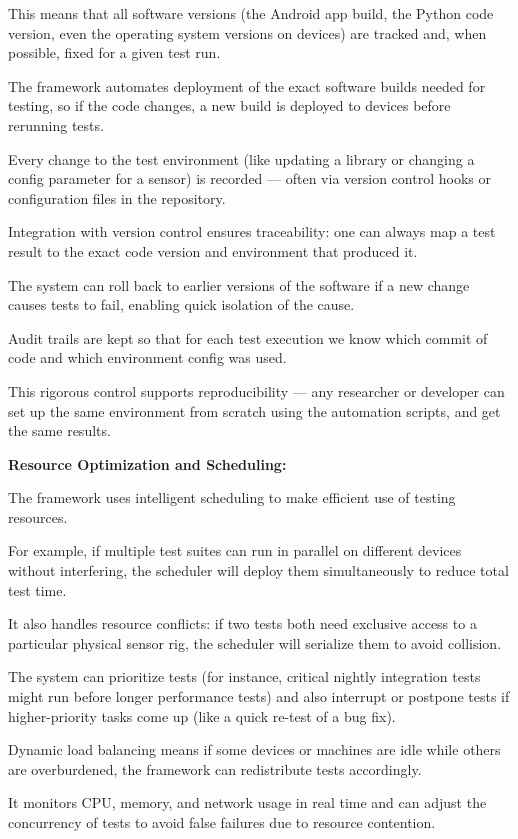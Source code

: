 {{This means that all software versions (the Android app build, the Python code
version, even the operating system versions on devices) are tracked and, when
possible, fixed for a given test run.

The framework automates deployment of the exact software builds needed for
testing, so if the code changes, a new build is deployed to devices before
rerunning tests.

Every change to the test environment (like updating a library or changing a
config parameter for a sensor) is recorded --- often via version control hooks
or configuration files in the repository.

Integration with version control ensures traceability: one can always map a test
result to the exact code version and environment that produced it.

The system can roll back to earlier versions of the software if a new change
causes tests to fail, enabling quick isolation of the cause.

Audit trails are kept so that for each test execution we know which commit of
code and which environment config was used.

This rigorous control supports reproducibility --- any researcher or developer
can set up the same environment from scratch using the automation scripts, and
get the same results.

\textbf{Resource Optimization and Scheduling:}

The framework uses intelligent scheduling to make efficient use of testing
resources.

For example, if multiple test suites can run in parallel on different devices
without interfering, the scheduler will deploy them simultaneously to reduce
total test time.

It also handles resource conflicts: if two tests both need exclusive access to a
particular physical sensor rig, the scheduler will serialize them to avoid
collision.

The system can prioritize tests (for instance, critical nightly integration
tests might run before longer performance tests) and also interrupt or postpone
tests if higher-priority tasks come up (like a quick re-test of a bug fix).

Dynamic load balancing means if some devices or machines are idle while others
are overburdened, the framework can redistribute tests accordingly.

It monitors CPU, memory, and network usage in real time and can adjust the
concurrency of tests to avoid false failures due to resource contention.

}}
